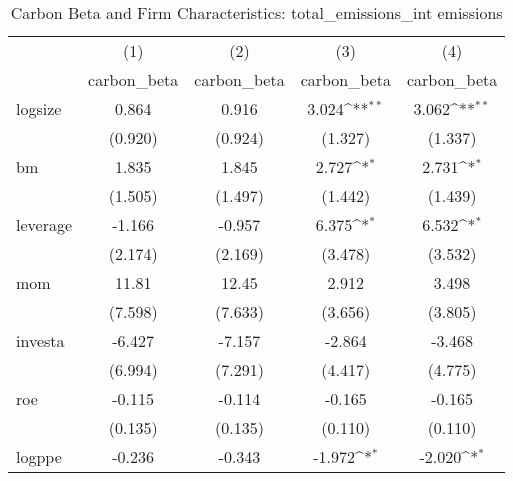 \begin{table}[htbp]\centering
\def\sym#1{\ifmmode^{#1}\else\(^{#1}\)\fi}
\caption{Carbon Beta and Firm Characteristics: total\_emissions\_int emissions}
\begin{tabular}{l*{4}{c}}
\hline\hline
                    &\multicolumn{1}{c}{(1)}&\multicolumn{1}{c}{(2)}&\multicolumn{1}{c}{(3)}&\multicolumn{1}{c}{(4)}\\
                    &\multicolumn{1}{c}{carbon\_beta}&\multicolumn{1}{c}{carbon\_beta}&\multicolumn{1}{c}{carbon\_beta}&\multicolumn{1}{c}{carbon\_beta}\\
\hline
logsize             &       0.864         &       0.916         &       3.024\sym{**} &       3.062\sym{**} \\
                    &     (0.920)         &     (0.924)         &     (1.327)         &     (1.337)         \\
[1em]
bm                  &       1.835         &       1.845         &       2.727\sym{*}  &       2.731\sym{*}  \\
                    &     (1.505)         &     (1.497)         &     (1.442)         &     (1.439)         \\
[1em]
leverage            &      -1.166         &      -0.957         &       6.375\sym{*}  &       6.532\sym{*}  \\
                    &     (2.174)         &     (2.169)         &     (3.478)         &     (3.532)         \\
[1em]
mom                 &       11.81         &       12.45         &       2.912         &       3.498         \\
                    &     (7.598)         &     (7.633)         &     (3.656)         &     (3.805)         \\
[1em]
investa             &      -6.427         &      -7.157         &      -2.864         &      -3.468         \\
                    &     (6.994)         &     (7.291)         &     (4.417)         &     (4.775)         \\
[1em]
roe                 &      -0.115         &      -0.114         &      -0.165         &      -0.165         \\
                    &     (0.135)         &     (0.135)         &     (0.110)         &     (0.110)         \\
[1em]
logppe              &      -0.236         &      -0.343         &      -1.972\sym{*}  &      -2.020\sym{*}  \\

\end{tabular}
\end{table}
